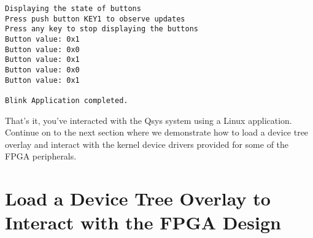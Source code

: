 \begin{flushleft}
\begin{enumerate}[
	label=\textbf{Step \arabic*.},
	leftmargin=*,
	widest={00},
	align=left]
\begin{verbatim}
Displaying the state of buttons
Press push button KEY1 to observe updates
Press any key to stop displaying the buttons
Button value: 0x1
Button value: 0x0
Button value: 0x1
Button value: 0x0
Button value: 0x1

Blink Application completed.

\end{verbatim}

\end{enumerate}

That's it, you've interacted with the Qsys system using a Linux application.  Continue on to the next section where we demonstrate how to load a device tree overlay and interact with the kernel device drivers provided for some of the FPGA peripherals.

\end{flushleft}

\section*{Load a Device Tree Overlay to Interact with the FPGA Design}

